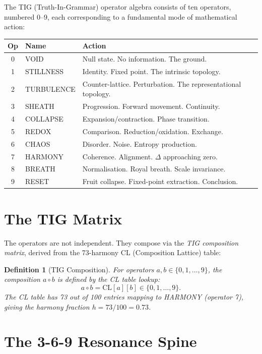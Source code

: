 \documentclass[12pt, openany]{book}
\newtheorem{definition}[theorem]{Definition}
\theoremstyle{remark}
\begin{document}
The TIG (Truth-In-Grammar) operator algebra consists of ten operators, numbered 0--9,
each corresponding to a fundamental mode of mathematical action:

\begin{center}
\begin{tabular}{cll}
\toprule
\textbf{Op} & \textbf{Name} & \textbf{Action} \\
\midrule
0 & VOID      & Null state. No information. The ground. \\
1 & STILLNESS & Identity. Fixed point. The intrinsic topology. \\
2 & TURBULENCE& Counter-lattice. Perturbation. The representational topology. \\
3 & SHEATH    & Progression. Forward movement. Continuity. \\
4 & COLLAPSE  & Expansion/contraction. Phase transition. \\
5 & REDOX     & Comparison. Reduction/oxidation. Exchange. \\
6 & CHAOS     & Disorder. Noise. Entropy production. \\
7 & HARMONY   & Coherence. Alignment. $\Delta$ approaching zero. \\
8 & BREATH    & Normalisation. Royal breath. Scale invariance. \\
9 & RESET     & Fruit collapse. Fixed-point extraction. Conclusion. \\
\bottomrule
\end{tabular}
\end{center}

\section{The TIG Matrix}

The operators are not independent. They compose via the \emph{TIG composition matrix},
derived from the 73-harmony CL (Composition Lattice) table:

\begin{definition}[TIG Composition]
\label{def:tig-comp}
For operators $a, b \in \{0, 1, \ldots, 9\}$, the composition $a \circ b$ is defined
by the CL table lookup:
\[
  a \circ b = \mathrm{CL}[a][b] \in \{0, 1, \ldots, 9\}.
\]
The CL table has 73 out of 100 entries mapping to HARMONY (operator 7), giving the
\emph{harmony fraction} $h = 73/100 = 0.73$.
\end{definition}

\section{The 3-6-9 Resonance Spine}
\end{document}
